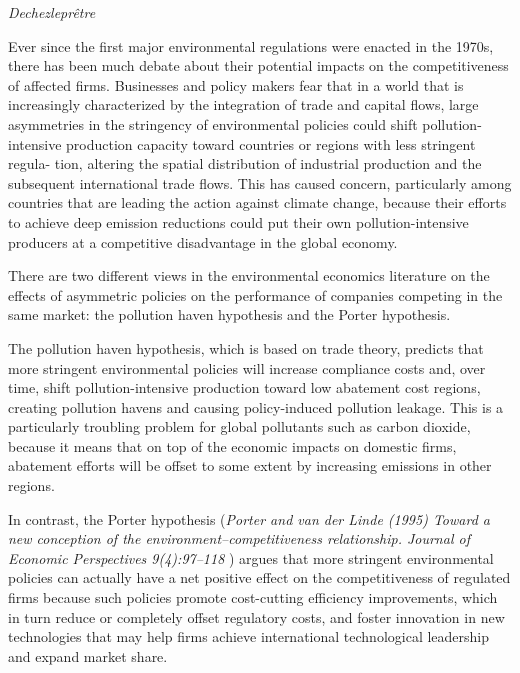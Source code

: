 \documentclass[
]{book}
\begin{document}
\emph{Dechezleprêtre}

Ever since the first major environmental regulations were enacted in the 1970s, there has been
much debate about their potential impacts on the competitiveness of affected firms. Businesses
and policy makers fear that in a world that is increasingly characterized by the integration of trade
and capital flows, large asymmetries in the stringency of environmental policies could shift
pollution-intensive production capacity toward countries or regions with less stringent regula-
tion, altering the spatial distribution of industrial production and the subsequent international
trade flows. This has caused concern, particularly among countries that are leading the action
against climate change, because their efforts to achieve deep emission reductions could put their
own pollution-intensive producers at a competitive disadvantage in the global economy.

There are two different views in the environmental economics literature on the effects of
asymmetric policies on the performance of companies competing in the same market: the
pollution haven hypothesis and the Porter hypothesis.

The pollution haven hypothesis, which
is based on trade theory, predicts that more stringent environmental policies will increase
compliance costs and, over time, shift pollution-intensive production toward low abatement
cost regions, creating pollution havens and causing policy-induced pollution leakage.
This is a particularly troubling problem for global pollutants
such as carbon dioxide, because it means that on top of the economic impacts on domestic
firms, abatement efforts will be offset to some extent by increasing emissions in other regions.

In contrast, the Porter hypothesis (\emph{Porter and van der Linde (1995) Toward a new conception of the
environment--competitiveness relationship. Journal of Economic Perspectives 9(4):97--118 }) argues that more
stringent environmental policies can actually have a net positive effect on the competitiveness
of regulated firms because such policies promote cost-cutting efficiency improvements, which
in turn reduce or completely offset regulatory costs, and foster innovation in new technologies
that may help firms achieve international technological leadership and expand market share.
\end{document}

